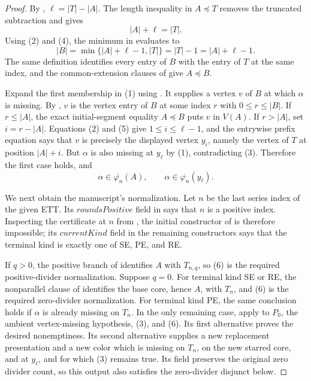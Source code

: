 \begin{proof}
By , \(\ell=|T|-|A|\).
The length inequality in \(A\preccurlyeq T\) removes the truncated
subtraction and gives
\[
                         |A|+\ell=|T|.                        \tag{4}
\]
Using (2) and (4), the minimum in
 evaluates to
\[
 |B|=\min\{|A|+\ell-1,|T|\}=|T|-1=|A|+\ell-1.                \tag{5}
\]
The same definition identifies every entry of \(B\) with the entry of
\(T\) at the same index, and the common-extension clauses of
 give \(A\preccurlyeq B\).

Expand the first membership in (1) using
.  It supplies a vertex \(v\) of \(B\) at
which \(\alpha\) is missing.  By
, \(v\) is the vertex entry of \(B\) at
some index \(r\) with \(0\leq r\leq |B|\).  If \(r\leq |A|\), the exact
initial-segment equality \(A\preccurlyeq B\) puts \(v\) in \(V(A)\).
If \(r>|A|\), set \(i=r-|A|\).  Equations (2) and (5) give
\(1\leq i\leq\ell-1\), and the entrywise prefix equation says that
\(v\) is precisely the displayed vertex \(y_i\), namely the vertex of
\(T\) at position \(|A|+i\).  But \(\alpha\) is also missing at
\(y_\ell\) by (1), contradicting (3).  Therefore the first case holds,
and
\[
             \alpha\in\overline{\varphi_n}(A),\qquad
             \alpha\in\overline{\varphi_n}(y_\ell).           \tag{6}
\]

We next obtain the manuscript's normalization.  Let \(n\) be the last
series index of the given ETT.  Its \(\mathit{roundsPositive}\) field in
 says that \(n\) is a positive index.
Inspecting the certificate at \(n\) from
, the initial constructor of
 is therefore impossible; its
\(\mathit{currentKind}\) field in the remaining constructors says that
the terminal kind is exactly one of SE, PE, and RE.

If \(q>0\), the positive branch of
 identifies \(A\) with \(T_{n,q}\), so
(6) is the required positive-divider normalization.  Suppose \(q=0\).
For terminal kind SE or RE, the nonparallel clause of
 identifies the base core, hence \(A\), with
\(T_n\), and (6) is the required zero-divider normalization.  For
terminal kind PE, the same conclusion holds if \(\alpha\) is already
missing on \(T_n\).  In the only remaining case, apply
 to \(P_0\), the ambient
vertex-missing hypothesis, (3), and (6).
Its first alternative proves the desired nonemptiness.  Its second
alternative supplies a new replacement presentation and a new color
which is missing on \(T_n\), on the new starred core, and at
\(y_\ell\), and for which (3) remains true.  Its
 field preserves the original zero divider
count, so this output also satisfies the zero-divider disjunct below.


\end{proof}
